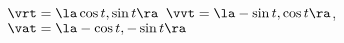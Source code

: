 {$\vrt = \la \cos t,\sin t\ra$
}
{
$\vvt = \la -\sin t, \cos t\ra$, $\vat = \la -\cos t, -\sin t \ra$}

